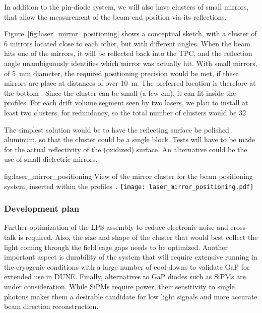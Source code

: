 In addition to the pin-diode system, we will also have clusters of small mirrors, that allow the measurement of the beam end position via its reflections.

Figure~\ref{fig:laser_mirror_positioning} shows a conceptual sketch, with a cluster of 6 mirrors located close to each other, but with different angles. When the beam hits one of the mirrors, it will be reflected back into the TPC, and the reflection angle unambiguously identifies which mirror was actually hit. With small mirrors, of \SI{5}{\milli\m} diameter, the required positioning precision would be met, if these mirrors are place at distances of over \SI{10}{\m}. The preferred location is therefore at the bottom . Since the cluster can be small (a few cm), it can fit inside the  profiles. For each drift volume segment seen by two lasers, we plan to install at least two clusters, for redundancy, so the total number of clusters would be \num{32}. 

The simplest solution would be to have the reflecting surface be polished aluminum, so that the cluster could be a single block. Tests will have to be made for the actual reflectivity of the (oxidized) surface. An alternative could be the use of small dielectric mirrors.

\begin{dunefigure}{fig:laser_mirror_positioning}
{View of the mirror cluster for the beam positioning system, inserted within the  profiles~\cite{bib:yu2019a}.}
\texttt{[image: laser\_mirror\_positioning.pdf]}
\end{dunefigure}

\subsubsection{Development plan}
 Further optimization of the LPS assembly to reduce electronic noise and cross-talk is required. Also, the size and shape of the cluster that would best collect the light coming through the field cage gaps needs to be optimized.  Another important aspect is durability of the system that will require extensive running in the cryogenic conditions with  a large number of cool-downs to validate GaP for extended use in DUNE. Finally, alternatives to GaP diodes such as SiPMs are under consideration. While SiPMs require power, their sensitivity to single photons makes them a desirable candidate for low light signals and more accurate beam direction reconstruction. 
















